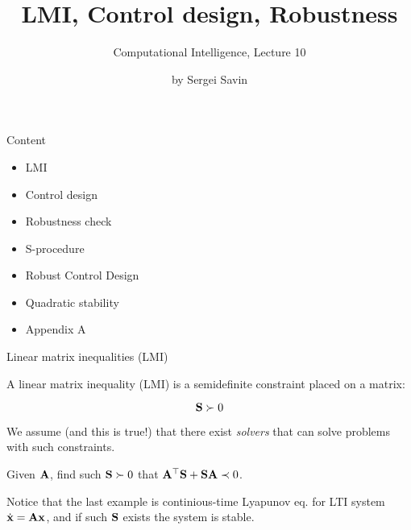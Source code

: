 \documentclass{beamer}
\title{LMI, Control design, Robustness}
\subtitle{Computational Intelligence, Lecture 10}
\author{by Sergei Savin}
\date{\mydate}
\begin{document}
\maketitle


\begin{frame}{Content}
	
	\begin{itemize}
		\item LMI
		\item Control design
		\item Robustness check
		\item S-procedure
		\item Robust Control Design
		\item Quadratic stability
		\item Appendix A
	\end{itemize}
	
	
\end{frame}




\begin{frame}{Linear matrix inequalities (LMI)}
	\begin{flushleft}
		
		A linear matrix inequality (LMI) is a semidefinite constraint placed on a matrix:
		
		\begin{equation}
			\mathbf{S} \succ 0
		\end{equation}
		
		We assume (and this is true!) that there exist \emph{solvers} that can solve problems with such constraints. 
		
		
		\begin{example}
			Given $\mathbf{A}$, find such $\mathbf{S}\succ 0$ that $\mathbf{A}^\top\mathbf{S} + \mathbf{S}\mathbf{A} \prec 0$.
		\end{example}
		
		Notice that the last example is continious-time Lyapunov eq. for LTI system $\dot{\mathbf{x}} = \mathbf{A}\mathbf{x}$, and if such $\mathbf{S}$ exists the system is stable. 
		
	\end{flushleft}
\end{frame}
\end{document}

